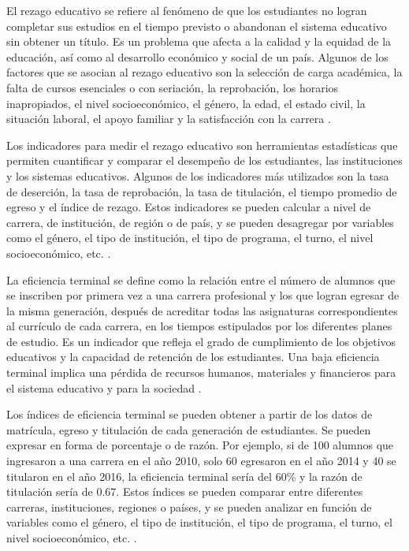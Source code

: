 \documentclass{article}
\begin{document}
El rezago educativo se refiere al fenómeno de que los estudiantes no logran completar sus estudios en el tiempo previsto o abandonan el sistema educativo sin obtener un título. Es un problema que afecta a la calidad y la equidad de la educación, así como al desarrollo económico y social de un país. Algunos de los factores que se asocian al rezago educativo son la selección de carga académica, la falta de cursos esenciales o con seriación, la reprobación, los horarios inapropiados, el nivel socioeconómico, el género, la edad, el estado civil, la situación laboral, el apoyo familiar y la satisfacción con la carrera \cite{fuente7, fuente8}.

Los indicadores para medir el rezago educativo son herramientas estadísticas que permiten cuantificar y comparar el desempeño de los estudiantes, las instituciones y los sistemas educativos. Algunos de los indicadores más utilizados son la tasa de deserción, la tasa de reprobación, la tasa de titulación, el tiempo promedio de egreso y el índice de rezago. Estos indicadores se pueden calcular a nivel de carrera, de institución, de región o de país, y se pueden desagregar por variables como el género, el tipo de institución, el tipo de programa, el turno, el nivel socioeconómico, etc. \cite{fuente7, fuente9}.

La eficiencia terminal se define como la relación entre el número de alumnos que se inscriben por primera vez a una carrera profesional y los que logran egresar de la misma generación, después de acreditar todas las asignaturas correspondientes al currículo de cada carrera, en los tiempos estipulados por los diferentes planes de estudio. Es un indicador que refleja el grado de cumplimiento de los objetivos educativos y la capacidad de retención de los estudiantes. Una baja eficiencia terminal implica una pérdida de recursos humanos, materiales y financieros para el sistema educativo y para la sociedad \cite{fuente2, fuente3}.

Los índices de eficiencia terminal se pueden obtener a partir de los datos de matrícula, egreso y titulación de cada generación de estudiantes. Se pueden expresar en forma de porcentaje o de razón. Por ejemplo, si de 100 alumnos que ingresaron a una carrera en el año 2010, solo 60 egresaron en el año 2014 y 40 se titularon en el año 2016, la eficiencia terminal sería del 60\% y la razón de titulación sería de 0.67. Estos índices se pueden comparar entre diferentes carreras, instituciones, regiones o países, y se pueden analizar en función de variables como el género, el tipo de institución, el tipo de programa, el turno, el nivel socioeconómico, etc. \cite{fuente2, fuente3}.
\end{document}
